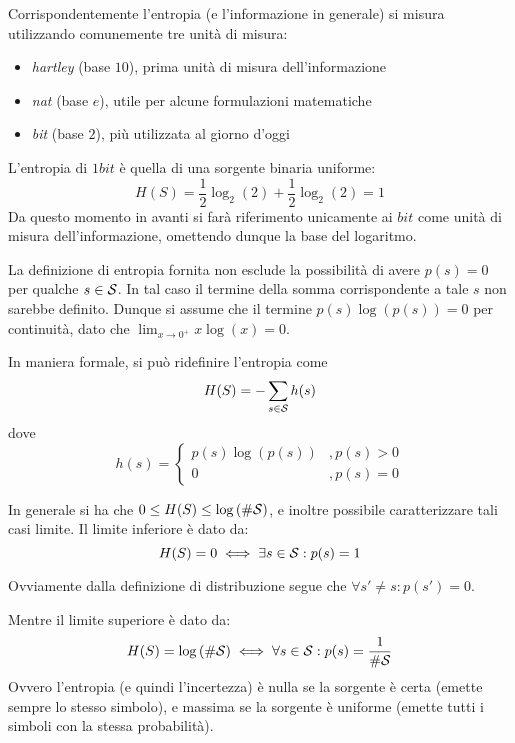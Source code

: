Corrispondentemente l'entropia (e l'informazione in generale) si misura utilizzando comunemente tre unità di misura:
\begin{itemize}
  \item \emph{hartley} (base \(10\)), prima unità di misura dell'informazione
  \item \emph{nat} (base \(e\)), utile per alcune formulazioni matematiche
  \item \emph{bit} (base \(2\)), più utilizzata al giorno d'oggi
\end{itemize}
L'entropia di \(1 bit\) è quella di una sorgente binaria uniforme:
\[H(S) = \frac{1}{2}\log_2(2) + \frac{1}{2}\log_2(2) = 1\]
Da questo momento in avanti si farà riferimento unicamente ai \(bit\) come unità di misura dell'informazione, omettendo dunque la base del logaritmo.

\begin{note}{}
  La definizione di entropia fornita non esclude la possibilità di avere \(p(s) = 0\) per qualche \(s \in \mathcal{S}\).
  In tal caso il termine della somma corrispondente a tale \(s\) non sarebbe definito. 
  Dunque si assume che il termine \(p(s)\log\left(p(s)\right) = 0\) per continuità, dato che \(\lim_{x \to 0^+} x \log\left(x\right) = 0\).

  In maniera formale, si può ridefinire l'entropia come
  \[H(S) = -\sum_{s \in \mathcal{S}} h(s)\]
  dove
  \[h(s) = \begin{cases}
              p(s) \log\left(p(s)\right) & , p(s) > 0 \\
              0 & , p(s) = 0
            \end{cases}
  \]
\end{note}

In generale si ha che \(0 \leq H(S) \leq \log\left(\#\mathcal{S}\right)\), e inoltre possibile caratterizzare tali casi limite.
Il limite inferiore è dato da:
\begin{equation}\label{eq:lower_bound_entropy}
    H(S) = 0 \iff \exists s \in \mathcal{S}: p(s) = 1
\end{equation}

Ovviamente dalla definizione di distribuzione segue che \(\forall s' \neq s: p(s') = 0\).

Mentre il limite superiore è dato da:
\begin{equation}\label{eq:upper_bound_entropy}
  H(S) = \log\left(\#\mathcal{S}\right) \iff \forall s \in \mathcal{S}: p(s) = \frac{1}{\#\mathcal{S}}
\end{equation}
Ovvero l'entropia (e quindi l'incertezza) è nulla se la sorgente è certa (emette sempre lo stesso simbolo), e massima se la sorgente è uniforme (emette tutti i simboli con la stessa probabilità).

